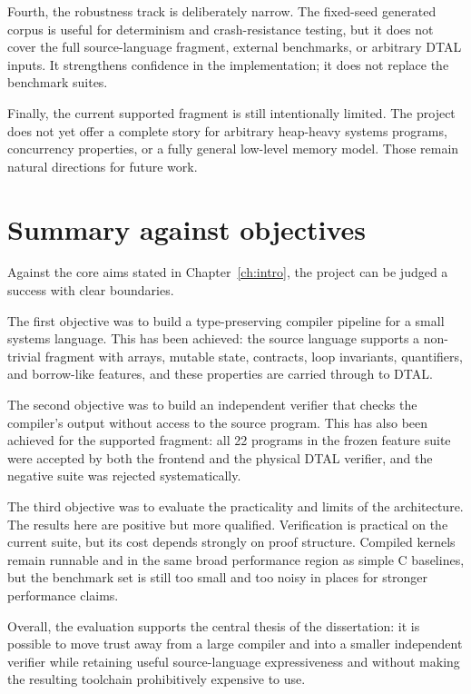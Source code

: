 Fourth, the robustness track is deliberately narrow. The fixed-seed generated
corpus is useful for determinism and crash-resistance testing, but it does not
cover the full source-language fragment, external benchmarks, or arbitrary DTAL
inputs. It strengthens confidence in the implementation; it does not replace
the benchmark suites.

Finally, the current supported fragment is still intentionally limited. The
project does not yet offer a complete story for arbitrary heap-heavy systems
programs, concurrency properties, or a fully general low-level memory model.
Those remain natural directions for future work.

\section{Summary against objectives}

Against the core aims stated in Chapter~\ref{ch:intro}, the project can be
judged a success with clear boundaries.

The first objective was to build a type-preserving compiler pipeline for a
small systems language. This has been achieved: the source language supports a
non-trivial fragment with arrays, mutable state, contracts, loop invariants,
quantifiers, and borrow-like features, and these properties are carried through
to DTAL.

The second objective was to build an independent verifier that checks the
compiler's output without access to the source program. This has also been
achieved for the supported fragment: all 22 programs in the frozen feature
suite were accepted by both the frontend and the physical DTAL verifier, and
the negative suite was rejected systematically.

The third objective was to evaluate the practicality and limits of the
architecture. The results here are positive but more qualified. Verification is
practical on the current suite, but its cost depends strongly on proof
structure. Compiled kernels remain runnable and in the same broad performance
region as simple C baselines, but the benchmark set is still too small and too
noisy in places for stronger performance claims.

Overall, the evaluation supports the central thesis of the dissertation: it is
possible to move trust away from a large compiler and into a smaller
independent verifier while retaining useful source-language expressiveness and
without making the resulting toolchain prohibitively expensive to use.

